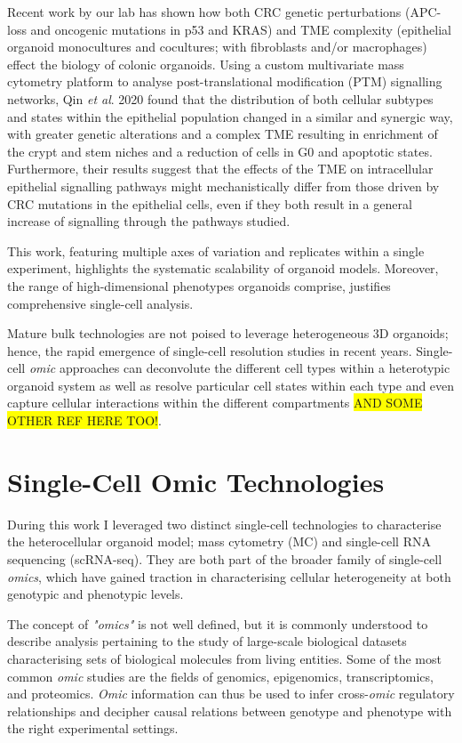 Recent work by our lab \cite{qin_cell-type-specific_2020} has shown how both CRC genetic perturbations (APC-loss and oncogenic mutations in p53 and KRAS) and TME complexity (epithelial organoid monocultures and cocultures; with fibroblasts and/or macrophages) effect the biology of colonic organoids. Using a custom multivariate mass cytometry platform to analyse post-translational modification (PTM) signalling networks, Qin \textit{et al}. 2020 found that the distribution of both cellular subtypes and states within the epithelial population changed in a similar and synergic way, with greater genetic alterations and a complex TME resulting in enrichment of the crypt and stem niches and a reduction of cells in G0 and apoptotic states. Furthermore, their results suggest that the effects of the TME on intracellular epithelial signalling pathways might mechanistically differ from those driven by CRC mutations in the epithelial cells, even if they both result in a general increase of signalling through the pathways studied.

This work, featuring multiple axes of variation and replicates within a single experiment, highlights the systematic scalability of organoid models. Moreover, the range of high-dimensional phenotypes organoids comprise, justifies comprehensive single-cell analysis.

Mature bulk technologies are not poised to leverage heterogeneous 3D organoids; hence, the rapid emergence of single-cell resolution studies in recent years. Single-cell \emph{omic} approaches can deconvolute the different cell types within a heterotypic organoid system as well as resolve particular cell states within each type and even capture cellular interactions within the different compartments \cite{tape_heterocellular_2017} \colorbox{yellow}{AND SOME OTHER REF HERE TOO!}.


\section{Single-Cell Omic Technologies}

During this work I leveraged two distinct single-cell technologies to characterise the heterocellular organoid model; mass cytometry (MC) and single-cell RNA sequencing (scRNA-seq). They are both part of the broader family of single-cell \emph{omics}, which have gained traction in characterising cellular heterogeneity at both genotypic and phenotypic levels. 

The concept of \emph{"omics"} is not well defined, but it is commonly understood to describe analysis pertaining to the study of large-scale biological datasets characterising sets of biological molecules from living entities. Some of the most common \emph{omic} studies are the fields of genomics, epigenomics, transcriptomics, and proteomics.
\emph{Omic} information can thus be used to infer cross-\emph{omic} regulatory relationships and decipher causal relations between genotype and phenotype with the right experimental settings.


